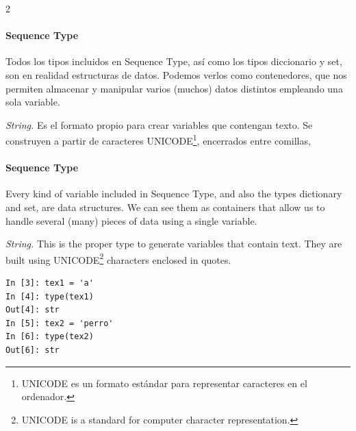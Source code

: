 \begin{paracol}{2}
\paragraph{Sequence Type}
    Todos los tipos incluidos en Sequence Type, así como los tipos diccionario y set, son en realidad estructuras de datos. Podemos verlos como contenedores, que nos permiten almacenar y manipular varios (muchos) datos distintos empleando una sola variable.
         
         \emph{String.} Es el formato propio para crear variables que contengan texto. Se construyen a partir de caracteres UNICODE\footnote{UNICODE es un formato estándar para representar caracteres en el ordenador.}, encerrados entre comillas,

\switchcolumn
\paragraph{Sequence Type} Every kind of variable included in Sequence Type, and also the types dictionary and set, are data structures. We can see them as containers that allow us to handle several (many) pieces of data using a single variable.

\emph{String.} This is the proper type to generate variables that contain text. They are built using UNICODE\footnote{UNICODE is a standard for computer character representation.} characters enclosed in quotes.

\end{paracol}
\begin{center}
\begin{minipage}{0.2\textwidth}
\begin{verbatim}
In [3]: tex1 = 'a'
In [4]: type(tex1)
Out[4]: str
In [5]: tex2 = 'perro'
In [6]: type(tex2)
Out[6]: str
\end{verbatim}
\end{minipage}
\end{center}

